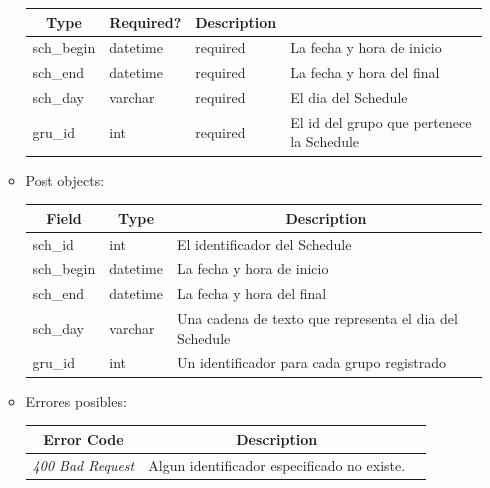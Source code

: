\documentclass{article}
\begin{document}
\begin{enumerate}
\begin{itemize}
\begin{table}[H]
\begin{tabular}{|l|l|l|l|}
        \multicolumn{1}{c|}{\textbf{Type}} &
        \multicolumn{1}{c|}{\textbf{Required?}} &
        \multicolumn{1}{c|}{\textbf{Description}} \\ \hline sch\_begin &
        datetime & required & La fecha y hora de inicio \\ \hline sch\_end &
        datetime & required & La fecha y hora del final \\ \hline sch\_day &
        varchar & required & El dia del Schedule \\ \hline gru\_id & int &
        required & El id del grupo que pertenece la Schedule \\ \hline
        \end{tabular} \end{table}
        \item Post objects:
        \begin{table}[H] \centering \begin{tabular}{|l|l|l|} \hline
        \multicolumn{1}{|c|}{\textbf{Field}} &
        \multicolumn{1}{c|}{\textbf{Type}} &
        \multicolumn{1}{c|}{\textbf{Description}} \\ \hline sch\_id & int & El
        identificador del Schedule \\ \hline sch\_begin & datetime & La fecha y
        hora de inicio \\ \hline sch\_end & datetime & La fecha y hora del final
        \\ \hline sch\_day & varchar & Una cadena de texto que representa el dia
        del Schedule \\ \hline gru\_id & int & Un identificador para cada grupo
        registrado \\ \hline \end{tabular} \end{table}

        \item Errores posibles: \begin{table}[H] \centering \begin{tabular}{|c|c|l|} \hline
        \textbf{Error Code} & \textbf{Description} \\ \hline \textit{400 Bad
        Request} & Algun identificador especificado no existe. \\ \hline
        \end{tabular} \end{table}
    \end{itemize}


\end{enumerate}
\end{document}
